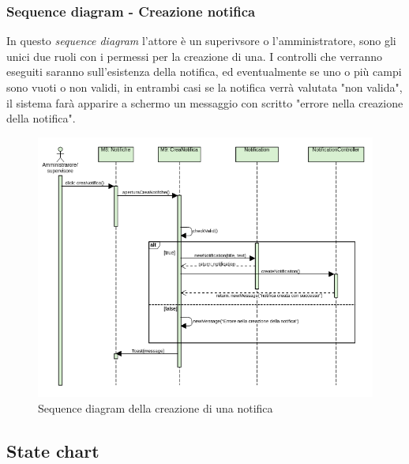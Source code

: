 \subsubsection{Sequence diagram - Creazione notifica}
In questo \textit{sequence diagram} l'attore è un superivsore o l'amministratore, sono gli unici due ruoli con i permessi per la creazione di una. I controlli che verranno eseguiti saranno sull'esistenza della notifica, ed eventualmente se uno o più campi sono vuoti o non validi, in entrambi casi se la notifica verrà valutata "non valida", il sistema farà apparire a schermo un messaggio con scritto "errore nella creazione della notifica".
\begin{figure}[H]
  \centering
  \includegraphics[scale=0.9]{img/sequence/creazioneNotifica_sequence_diagraem.png}
  \caption{Sequence diagram della creazione di una notifica}
\end{figure}  
\newpage
\subsection{State chart}